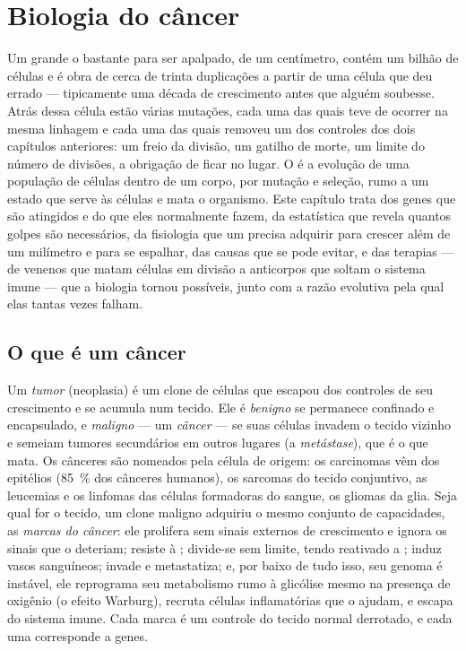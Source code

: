 \chapter{Biologia do câncer}\label{ch:b3:cancer-biology}

Um  grande o bastante para ser apalpado, de um centímetro, contém
um bilhão de células e é obra de cerca de trinta duplicações a partir
de uma célula que deu errado --- tipicamente uma década de crescimento
antes que alguém soubesse. Atrás dessa célula estão várias mutações,
cada uma das quais teve de ocorrer na mesma linhagem e cada uma das
quais removeu um dos controles dos dois capítulos anteriores: um freio
da divisão, um gatilho de morte, um limite do número de divisões, a
obrigação de ficar no lugar. O  é a evolução de uma população de
células dentro de um corpo, por mutação e seleção, rumo a um estado que
serve às células e mata o organismo. Este capítulo trata dos genes que
são atingidos e do que eles normalmente fazem, da estatística que
revela quantos golpes são necessários, da fisiologia que um 
precisa adquirir para crescer além de um milímetro e para se espalhar,
das causas que se pode evitar, e das terapias --- de venenos que matam
células em divisão a anticorpos que soltam o sistema imune --- que a
biologia tornou possíveis, junto com a razão evolutiva pela qual elas
tantas vezes falham.

\section{O que é um câncer}

\begin{definition}\label{def:b3:cancer-biology:hallmarks}
Um \emph{tumor} (neoplasia) é um clone de células que escapou dos
controles de seu crescimento e se acumula num tecido. Ele é
\emph{benigno} se permanece confinado e encapsulado, e \emph{maligno}
--- um \emph{câncer} --- se suas células invadem o tecido vizinho e
semeiam tumores secundários em outros lugares (a \emph{metástase}), que
é o que mata. Os cânceres são nomeados pela célula de origem: os
carcinomas vêm dos epitélios (\qty{85}{\%} dos cânceres humanos), os
sarcomas do tecido conjuntivo, as leucemias e os linfomas das células
formadoras do sangue, os gliomas da glia. Seja qual for o tecido, um
clone maligno adquiriu o mesmo conjunto de capacidades, as \emph{marcas
do câncer}: ele prolifera sem sinais externos de crescimento e ignora
os sinais que o deteriam; resiste à ; divide-se sem limite,
tendo reativado a ; induz vasos sanguíneos; invade e
metastatiza; e, por baixo de tudo isso, seu genoma é instável, ele
reprograma seu metabolismo rumo à glicólise mesmo na presença de
oxigênio (o efeito Warburg), recruta células inflamatórias que o
ajudam, e escapa do sistema imune. Cada marca é um controle do tecido
normal derrotado, e cada uma corresponde a genes.
\end{definition}

